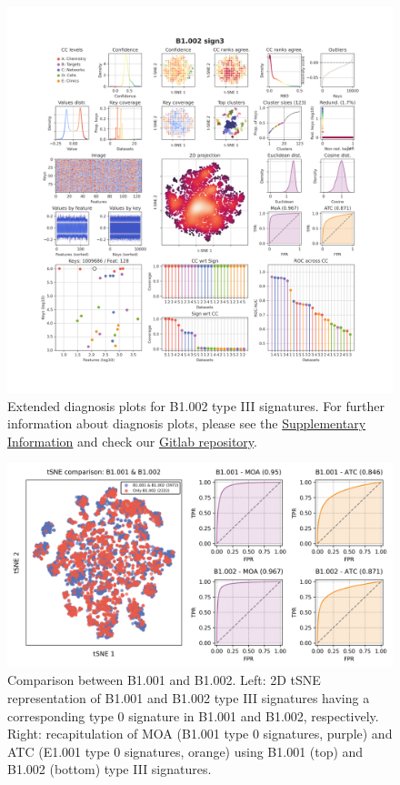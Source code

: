 \begin{figure}[htbp]
  \centering
  \includegraphics[width=1\linewidth]{figures/Protocols/Supplementary/B1_medium.sign3_v2.png}
  \caption{
    Extended diagnosis plots for B1.002 type III signatures. For further information about diagnosis plots, please see the \hyperref[Supplementary_Protocols_Diagnosis]{Supplementary Information} and check our \href{https://gitlabsbnb.irbbarcelona.org/packages/protocols}{Gitlab repository}.
  }
  \label{Protocols_FigS2}
\end{figure}


\begin{figure}[htbp]
  \centering
  \includegraphics[width=1\linewidth]{figures/Protocols/Supplementary/FigS3.png}
  \caption{
    Comparison between B1.001 and B1.002. Left: 2D tSNE representation of B1.001 and B1.002 type III signatures having a corresponding type 0 signature in B1.001 and B1.002, respectively. Right: recapitulation of MOA (B1.001 type 0 signatures, purple) and ATC (E1.001 type 0 signatures, orange) using B1.001 (top) and B1.002 (bottom) type III signatures. 
  }
  \label{Protocols_FigS3}
\end{figure}


